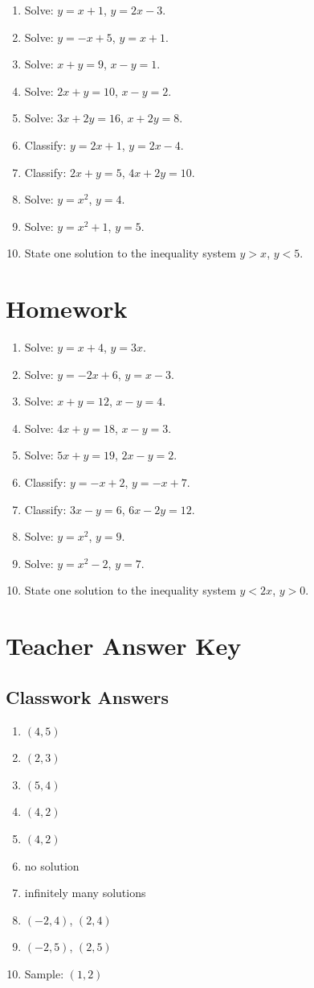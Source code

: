 \documentclass[11pt]{book}
\begin{document}
\begin{enumerate}
\item Solve: \(y=x+1\), \(y=2x-3\).
\item Solve: \(y=-x+5\), \(y=x+1\).
\item Solve: \(x+y=9\), \(x-y=1\).
\item Solve: \(2x+y=10\), \(x-y=2\).
\item Solve: \(3x+2y=16\), \(x+2y=8\).
\item Classify: \(y=2x+1\), \(y=2x-4\).
\item Classify: \(2x+y=5\), \(4x+2y=10\).
\item Solve: \(y=x^2\), \(y=4\).
\item Solve: \(y=x^2+1\), \(y=5\).
\item State one solution to the inequality system \(y>x\), \(y<5\).
\end{enumerate}

\section{Homework}

\begin{enumerate}
\item Solve: \(y=x+4\), \(y=3x\).
\item Solve: \(y=-2x+6\), \(y=x-3\).
\item Solve: \(x+y=12\), \(x-y=4\).
\item Solve: \(4x+y=18\), \(x-y=3\).
\item Solve: \(5x+y=19\), \(2x-y=2\).
\item Classify: \(y=-x+2\), \(y=-x+7\).
\item Classify: \(3x-y=6\), \(6x-2y=12\).
\item Solve: \(y=x^2\), \(y=9\).
\item Solve: \(y=x^2-2\), \(y=7\).
\item State one solution to the inequality system \(y<2x\), \(y>0\).
\end{enumerate}

\section{Teacher Answer Key}

\subsection{Classwork Answers}

\begin{enumerate}
\item \((4,5)\)
\item \((2,3)\)
\item \((5,4)\)
\item \((4,2)\)
\item \((4,2)\)
\item no solution
\item infinitely many solutions
\item \((-2,4)\), \((2,4)\)
\item \((-2,5)\), \((2,5)\)
\item Sample: \((1,2)\)
\end{enumerate}
\end{document}

